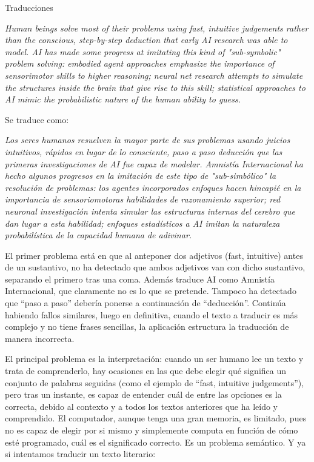 \documentclass[spanish, a4paper, 12pt]{article} 	%
\begin{document}
\begin{section}{Traducciones}

	\textit{Human beings solve most of their problems using fast, intuitive judgements rather than the conscious, step-by-step deduction that early AI research was able to model. AI has made some progress at imitating this kind of "sub-symbolic" problem solving: embodied agent approaches emphasize the importance of sensorimotor skills to higher reasoning; neural net research attempts to simulate the structures inside the brain that give rise to this skill; statistical approaches to AI mimic the probabilistic nature of the human ability to guess.}

	\vspace{0.5cm}

	Se traduce como:

	\vspace{0.5cm}

	\textit{Los seres humanos resuelven la mayor parte de sus problemas usando juicios intuitivos, rápidos en lugar de lo consciente, paso a paso deducción que las primeras investigaciones de AI fue capaz de modelar. Amnistía Internacional ha hecho algunos progresos en la imitación de este tipo de "sub-simbólico" la resolución de problemas: los agentes incorporados enfoques hacen hincapié en la importancia de sensoriomotoras habilidades de razonamiento superior; red neuronal investigación intenta simular las estructuras internas del cerebro que dan lugar a esta habilidad; enfoques estadísticos a AI imitan la naturaleza probabilística de la capacidad humana de adivinar.	}
	
	\vspace{0.5cm}

	El primer problema está en que al anteponer dos adjetivos (fast, intuitive) antes de un sustantivo, no ha detectado que ambos adjetivos van con dicho sustantivo, separando el primero tras una coma. Además traduce AI como Amnistía Internacional, que claramente no es lo que se pretende. Tampoco ha detectado que ``paso a paso'' debería ponerse a continuación de ``deducción''. Continúa habiendo fallos similares, luego en definitiva, cuando el texto a traducir es más complejo y no tiene frases sencillas, la aplicación estructura la traducción de manera incorrecta. 
	
	El principal problema es la interpretación: cuando un ser humano lee un texto y trata de comprenderlo, hay ocasiones en las que debe elegir qué significa un conjunto de palabras seguidas (como el ejemplo de ``fast, intuitive judgements''), pero tras un instante, es capaz de entender cuál de entre las opciones es la correcta, debido al contexto y a todos los textos anteriores que ha leído y comprendido. El computador, aunque tenga una gran memoria, es limitado, pues no es capaz de elegir por si mismo y simplemente computa en función de cómo esté programado, cuál es el significado correcto. Es un problema semántico. Y ya si intentamos traducir un texto literario:
	

\end{section}
\end{document}
